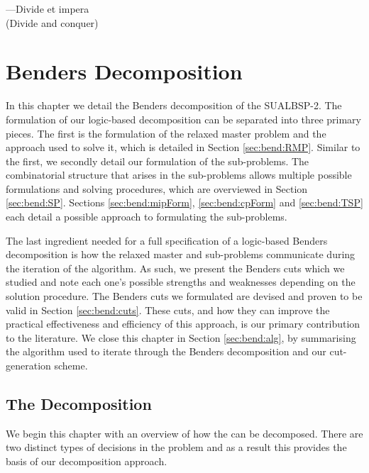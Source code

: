 
\begin{savequote}%
---Divide et impera\\
(Divide and conquer)
\end{savequote}


\chapter{Benders Decomposition}
\label{chap:benders}
In this chapter we detail the Benders decomposition of the SUALBSP-2. 
The formulation of our logic-based decomposition can be separated into three primary pieces. 
The first is the formulation of the relaxed master problem and the approach used to solve it,
which is detailed in Section \ref{sec:bend:RMP}. 
Similar to the first, we secondly detail our formulation of the sub-problems.
The combinatorial structure that arises in the sub-problems allows multiple possible formulations
and solving procedures, which are overviewed in Section \ref{sec:bend:SP}.
Sections \ref{sec:bend:mipForm}, \ref{sec:bend:cpForm} and \ref{sec:bend:TSP}
each detail a possible approach to formulating
the sub-problems.

The last ingredient needed for a full specification of a logic-based Benders decomposition
is how the relaxed master and sub-problems communicate during
the iteration of the algorithm.
As such, we present the Benders cuts which we studied and note each one's
possible strengths and weaknesses depending on the solution procedure.
The Benders cuts we formulated are devised and proven to be valid 
in Section \ref{sec:bend:cuts}.
These cuts, and how they can improve the 
practical effectiveness and efficiency of this approach,
is our primary contribution to the literature.
We close this chapter in Section \ref{sec:bend:alg}, by summarising
the algorithm used to iterate through
the Benders decomposition and our cut-generation scheme.

\section{The Decomposition}
\label{sec:bend:decomp}
We begin this chapter with an overview of how the
 can be decomposed.
There are two distinct types of decisions in the problem
and as a result this provides the basis
of our decomposition approach.

